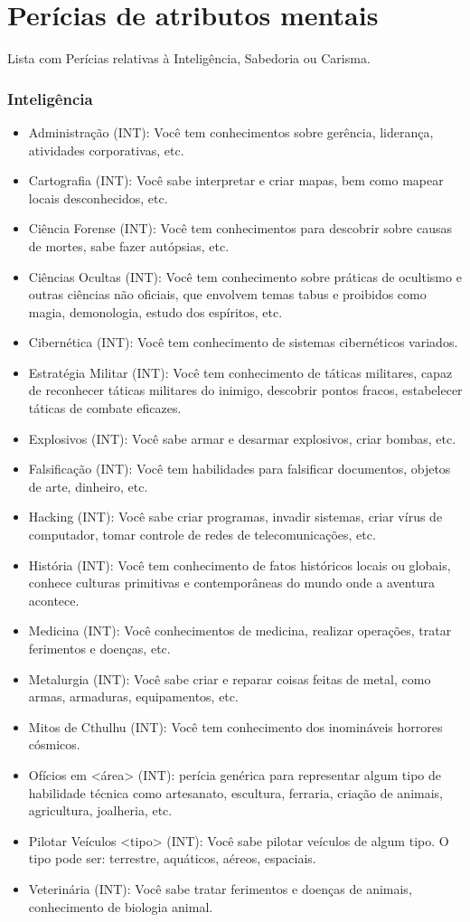 \section{\label{sec:perMentais}Perícias de atributos mentais}
Lista com Perícias relativas à Inteligência, Sabedoria ou Carisma.

\subsubsection*{Inteligência}
\begin{itemize}
	\item Administração (INT): Você tem conhecimentos sobre gerência, liderança, atividades corporativas, etc.
	\item Cartografia (INT): Você sabe interpretar e criar mapas, bem como mapear locais desconhecidos, etc.
	\item Ciência Forense (INT): Você tem conhecimentos para descobrir sobre causas de mortes, sabe fazer autópsias, etc.
	\item Ciências Ocultas (INT): Você tem conhecimento sobre práticas de ocultismo e outras ciências não oficiais, que envolvem temas tabus e proibidos como magia, demonologia, estudo dos espíritos, etc.
	\item Cibernética (INT): Você tem conhecimento de sistemas cibernéticos variados.
	\item Estratégia Militar (INT): Você tem conhecimento de táticas militares, capaz de reconhecer táticas militares do inimigo, descobrir pontos fracos, estabelecer táticas de combate eficazes.
	\item Explosivos (INT): Você sabe armar e desarmar explosivos, criar bombas, etc.
	\item Falsificação (INT): Você tem habilidades para falsificar documentos, objetos de arte, dinheiro, etc.
	\item Hacking (INT): Você sabe criar programas, invadir sistemas, criar vírus de computador, tomar controle de redes de telecomunicações, etc.
	\item História (INT): Você tem conhecimento de fatos históricos locais ou globais, conhece culturas primitivas e contemporâneas do mundo onde a aventura acontece.	
	\item Medicina (INT): Você conhecimentos de medicina, realizar operações, tratar ferimentos e doenças, etc.
	\item Metalurgia (INT): Você sabe criar e reparar coisas feitas de metal, como armas, armaduras, equipamentos, etc.
	\item Mitos de Cthulhu (INT): Você tem conhecimento dos inomináveis horrores cósmicos.
	\item Ofícios em <área> (INT): perícia genérica para representar algum tipo de habilidade técnica como artesanato, escultura, ferraria, criação de animais, agricultura, joalheria, etc.
	\item Pilotar Veículos <tipo> (INT): Você sabe pilotar veículos de algum tipo. O tipo pode ser: terrestre, aquáticos, aéreos, espaciais.
	\item Veterinária (INT): Você sabe tratar ferimentos e doenças de animais, conhecimento de biologia animal.	
\end{itemize}

